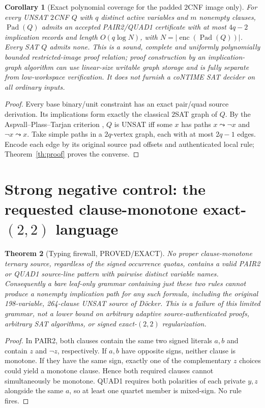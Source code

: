 \documentclass[11pt]{article}
\newtheorem{theorem}{Theorem}
\newtheorem{corollary}[theorem]{Corollary}
\begin{document}
\begin{corollary}[Exact polynomial coverage for the padded $2$CNF image only]\label{co:2sat}
For every UNSAT $2$CNF $Q$ with $q$ distinct active variables and $m$ nonempty clauses, $\operatorname{Pad}(Q)$ admits an accepted PAIR2/QUAD1 certificate with at most $4q-2$ implication records and length $O(q\log N)$, with $N=|\operatorname{enc}(\operatorname{Pad}(Q))|$. Every SAT $Q$ admits none. This is a sound, complete and uniformly polynomially bounded \emph{restricted-image} proof relation; proof construction by an implication-graph algorithm can use linear-size writable graph storage and is fully separate from low-workspace verification. It does not furnish a coNTIME SAT decider on all ordinary inputs.
\end{corollary}
\begin{proof}
Every base binary/unit constraint has an exact pair/quad source derivation. Its implications form exactly the classical $2$SAT graph of $Q$. By the Aspvall--Plass--Tarjan criterion \cite{aspvall1979}, $Q$ is UNSAT iff some $x$ has paths $x\leadsto\neg x$ and $\neg x\leadsto x$. Take simple paths in a $2q$-vertex graph, each with at most $2q-1$ edges. Encode each edge by its original source pad offsets and authenticated local rule; Theorem~\ref{th:proof} proves the converse.\end{proof}

\section{Strong negative control: the requested clause-monotone exact-$(2,2)$ language}
\begin{theorem}[Typing firewall, PROVED/EXACT]\label{th:monotone}
No \emph{proper clause-monotone} ternary source, regardless of the signed occurrence quotas, contains a valid PAIR2 or QUAD1 source-line pattern with pairwise distinct variable names. Consequently a bare leaf-only grammar containing just these two rules cannot produce a nonempty implication path for any such formula, including the original 198-variable, 264-clause UNSAT source of D\"ocker. This is a failure of this limited grammar, \emph{not} a lower bound on arbitrary adaptive source-authenticated proofs, arbitrary SAT algorithms, or signed exact-$(2,2)$ regularization.
\end{theorem}
\begin{proof}
In PAIR2, both clauses contain the same two signed literals $a,b$ and contain $z$ and $\neg z$, respectively. If $a,b$ have opposite signs, neither clause is monotone. If they have the same sign, exactly one of the complementary $z$ choices could yield a monotone clause. Hence both required clauses cannot simultaneously be monotone. QUAD1 requires both polarities of each private $y,z$ alongside the same $a$, so at least one quartet member is mixed-sign. No rule fires.\end{proof}
\end{document}

